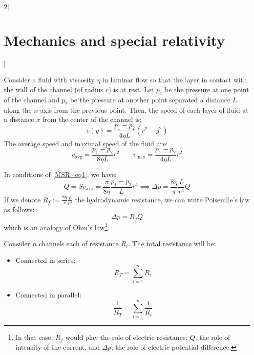\documentclass[../../../main.tex]{subfiles}
\begin{document}
\begin{multicols}{2}[\section{Mechanics and special relativity}]
\begin{proposition}[Viscosity]
  \end{proposition}
  \begin{center}
    \begin{minipage}{\linewidth}
      \centering
      
    \end{minipage}
  \end{center}
  \begin{proposition}
    Consider a fluid with viscosity $\eta$ in laminar flow so that the layer in contact with the wall of the channel (of radius $r$) is at rest. Let $p_1$ be the pressure at one point of the channel and $p_2$ be the pressure at another point separated a distance $L$ along the $x$-axis from the previous point. Then, the speed of each layer of fluid at a distance $x$ from the center of the channel is:
    $$v(y)=\frac{p_1-p_2}{4\eta L}(r^2-y^2)$$ The average speed and maximal speed of the fluid are:
    \begin{equation}
      v_\text{avg}=\frac{p_1-p_2}{8\eta L}r^2\qquad v_\text{max}=\frac{p_1-p_2}{4\eta L}r^2
      \label{MSR_eq1}
    \end{equation}
  \end{proposition}
  \begin{proposition}
    In conditions of \cref{MSR_eq1}, we have: $$Q=Sv_\text{avg}=\frac{\pi}{8\eta }\frac{p_1-p_2}{L}r^4\implies\Delta p=\frac{8\eta}{\pi}\frac{L}{r^4}Q$$ If we denote $\displaystyle R_f:=\frac{8\eta}{\pi}\frac{L}{r^4}$ the hydrodynamic resistance, we can write Poiseuille's law as follows: $$\Delta p=R_f Q$$ which is an analogy of Ohm's law\footnote{In that case, $R_f$ would play the role of electric resistance; $Q$, the role of intensity of the current, and $\Delta p$, the role of electric potential difference.}.
  \end{proposition}
  \begin{proposition}
    Consider $n$ channels each of resistance $R_i$. The total resistance will be:
    \begin{itemize}
      \item Connected in series: $$R_T=\sum_{i=1}^nR_i$$
      \item Connected in parallel: $$\frac{1}{R_T}=\sum_{i=1}^n\frac{1}{R_i}$$
    \end{itemize}
  \end{proposition}
  \begin{proposition}

\end{proposition}
\end{multicols}
\end{document}
